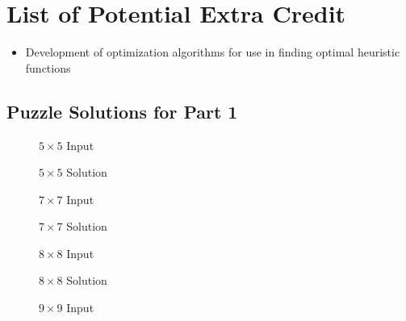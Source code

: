 \documentclass{article}[12pt]
\begin{document}
   
\newpage
   \section{List of Potential Extra Credit}
   \begin{itemize}
   \item Development of optimization algorithms for use in finding optimal heuristic functions
\end{itemize}      
   
   \newpage
\begin{appendices}

\section{Puzzle Solutions for Part 1}
   \label{appendix:p1}
   
   \begin{figure}[!htb]
   \centering
   \caption{$5 \times 5$ Input}
   \end{figure}

\begin{figure}[!htb]
	\centering
	\caption{$5 \times 5$ Solution}
\end{figure}

\begin{figure}[!htb]
	\centering
	\caption{$7 \times 7$ Input}
\end{figure}

\begin{figure}[!htb]
	\centering
	\caption{$7 \times 7$ Solution}
\end{figure}

\begin{figure}[!htb]
	\centering
	\caption{$8 \times 8$ Input}
\end{figure}

\begin{figure}[!htb]
	\centering
	\caption{$8 \times 8$ Solution}
\end{figure}

\begin{figure}[!htb]
	\centering
	\caption{$9 \times 9$ Input}
\end{figure}


\end{appendices}
\end{document}
